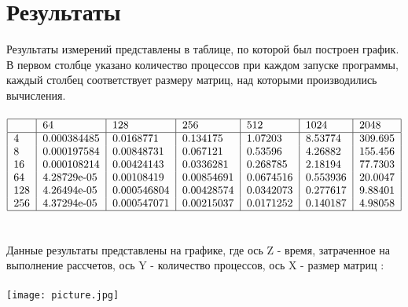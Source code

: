\documentclass[a4paper, 16pt]{extreport}
\begin{document}
    \chapter*{Результаты}
    Результаты измерений представлены в таблице, по которой был построен график. В первом столбце указано количество процессов при каждом запуске программы, каждый столбец соответствует размеру матриц, над которыми производились вычисления. 
    \\\\
    $\begin{tabular}{ | l | l | l | l | l | l |  l |}
    	\hline
    	 & 64 &  128 & 256 & 512 & 1024 & 2048 \\ 
    	\hline
    	4 & 0.000384485 & 0.0168771& 0.134175 & 1.07203&8.53774&309.695 \\
    	8 &0.000197584& 0.00848731&0.067121&0.53596&4.26882&155.456\\
    	16&0.000108214&0.00424143&0.0336281&0.268785& 2.18194&77.7303\\
    	64&4.28729e-05&0.00108419&0.00854691&0.0674516&0.553936&20.0047\\
    	128&4.26494e-05&0.000546804&0.00428574&0.0342073&0.277617&9.88401\\
    	256&4.37294e-05&0.000547071&0.00215037&0.0171252&0.140187&4.98058\\
       	\hline
    \end{tabular}$
	\\\\\\
	 Данные результаты представлены на графике, где ось Z - время, затраченное на выполнение рассчетов, ось Y - количество процессов, ось X - размер матриц : 
	 \\\\
	\texttt{[image: picture.jpg]}
	
\end{document}

